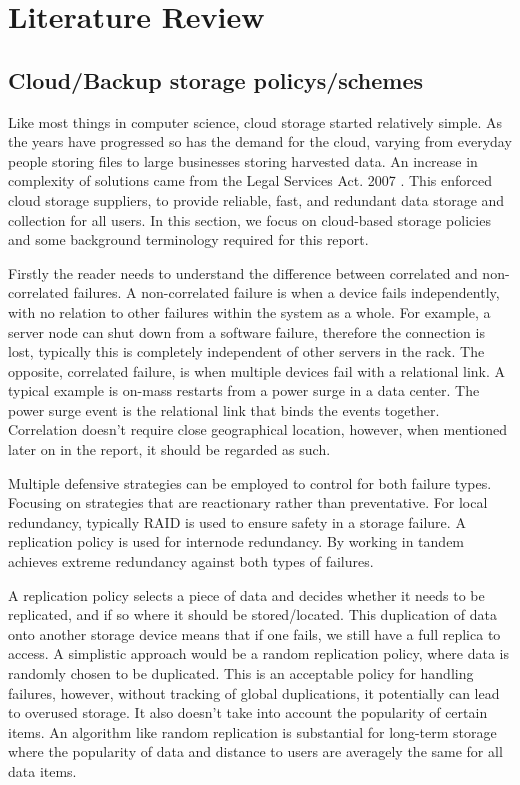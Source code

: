 \documentclass{UoYCSproject}
\begin{document}
\chapter{Literature Review}
\label{cha:Litreture Review}

\section{Cloud/Backup storage policys/schemes}
\label{sec:Cloud}

Like most things in computer science, cloud storage started relatively simple.
As the years have progressed so has the demand for the cloud, varying from everyday people storing files to large businesses storing harvested data.
An increase in complexity of solutions came from the Legal Services Act. 2007 \cite{LSA}.
This enforced cloud storage suppliers, to provide reliable, fast, and redundant data storage and collection for all users.
In this section, we focus on cloud-based storage policies and some background terminology required for this report.

Firstly the reader needs to understand the difference between correlated and non-correlated failures.
A non-correlated failure is when a device fails independently, with no relation to other failures within the system as a whole.
For example, a server node can shut down from a software failure, therefore the connection is lost, typically this is completely independent of other servers in the rack.
The opposite, correlated failure, is when multiple devices fail with a relational link.
A typical example is on-mass restarts from a power surge in a data center.
The power surge event is the relational link that binds the events together.
Correlation doesn't require close geographical location, however, when mentioned later on in the report, it should be regarded as such.

Multiple defensive strategies can be employed to control for both failure types.
Focusing on strategies that are reactionary rather than preventative.
For local redundancy, typically RAID is used to ensure safety in a storage failure.
A replication policy \cite{Avalability storage} is used for internode redundancy.
By working in tandem achieves extreme redundancy against both types of failures.

A replication policy selects a piece of data and decides whether it needs to be replicated, and if so where it should be stored/located.
This duplication of data onto another storage device means that if one fails, we still have a full replica to access.
A simplistic approach would be a random replication policy, where data is randomly chosen to be duplicated.
This is an acceptable policy for handling failures, however, without tracking of global duplications, it potentially can lead to overused storage.
It also doesn’t take into account the popularity of certain items.
An algorithm like random replication is substantial for long-term storage where the popularity of data and distance to users are averagely the same for all data items.
\end{document}
